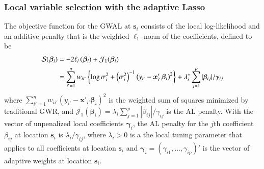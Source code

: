 \documentclass[authoryear, review, 11pt]{elsarticle}
\begin{document}
	\subsubsection{Local variable selection with the adaptive Lasso}
	The objective function for the GWAL at $\bm{s}_i$ consists of the local log-likelihood and an additive penalty that is the weighted $\ell_1$-norm of the coefficients, defined to be
	\begin{align}\label{eq:adaptive-lasso-WLS}
		\mathcal{S}(\bm{\beta}_i) &= -2\ell_i\left(\bm{\beta}_i\right) + \mathcal{J}_1(\bm{\beta}_i) \notag \\
		&= \sum_{i'=1}^n w_{ii'}  \left\{ \log{\sigma^2_i}  + \left(\sigma^2_i\right)^{-1}  \left(y_{i'} - \bm{x}'_{i'} \bm{\beta}_i \right)^2 \right\} +  \lambda^*_i \sum_{j=1}^p |\beta_{ij}| / \gamma_{ij}
	\end{align}
	where $\sum_{i'=1}^n w_{ii'} \left(y_{i'} - \bm{x}'_{i'} \bm{\beta}_i \right)^2$ is the weighted sum of squares minimized by traditional GWR, and $\mathcal{J}_1(\bm{\beta}_i) = \lambda_i \sum_{j=1}^p |\beta_{ij}| / \gamma_{ij}$ is the AL penalty. With the vector of unpenalized local coefficients $\bm{\gamma}_i$, the AL penalty for the $j$th coefficient $\beta_{ij}$ at location $\bm{s}_i$ is $\lambda_i / \gamma_{ij}$, where $\lambda_i > 0$ is a the local tuning parameter that applies to all coefficients at location $\bm{s}_i$ and $\bm{\gamma}_i = \left(\gamma_{i1}, \dots, \gamma_{ip}\right)'$ is the vector of adaptive weights at location $\bm{s}_i$.
	
\end{document}
